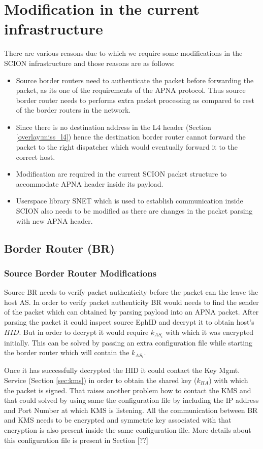 \section{Modification in the current infrastructure} \label{overlay:modifications}
There are various reasons due to which we require some modifications in the SCION infrastructure and those reasons are as follows:
\begin{itemize}
    \item Source border routers need to authenticate the packet before forwarding the packet, as its one of the requirements of the APNA protocol. Thus source border router needs to performs extra packet processing as compared to rest of the border routers in the network.
    \item Since there is no destination address in the L4 header (Section \ref{overlay:miss_l4}) hence the destination border router cannot forward the packet to the right dispatcher which would eventually forward it to the correct host.
    \item Modification are required in the current SCION packet structure to accommodate APNA header inside its payload.
    \item Userspace library SNET which is used to establish communication inside SCION also needs to be modified as there are changes in the packet parsing with new APNA header.
\end{itemize}

\subsection{Border Router (BR)}

\subsubsection{Source Border Router Modifications}
Source BR needs to verify packet authenticity before the packet can the leave the host AS. In order to verify packet authenticity BR would needs to find the sender of the packet which can obtained by parsing payload into an APNA packet. After parsing the packet it could inspect source EphID and decrypt it to obtain host's $HID$. But in order to decrypt it would require $k_{AS_{i}}$ with which it was encrypted initially. This can be solved by passing an extra configuration file while starting the border router which will contain the $k_{AS_{i}}$.

Once it has successfully decrypted the HID it could contact the Key Mgmt. Service (Section \ref{sec:kms}) in order to obtain the shared key ($k_{HA}$) with which the packet is signed. That raises another problem how to contact the KMS and that could solved by using same the configuration file by including the IP address and Port Number at which KMS is listening. All the communication between BR and KMS needs to be encrypted and symmetric key associated with that encryption is also present inside the same configuration file. More details about this configuration file is present in Section [??]

